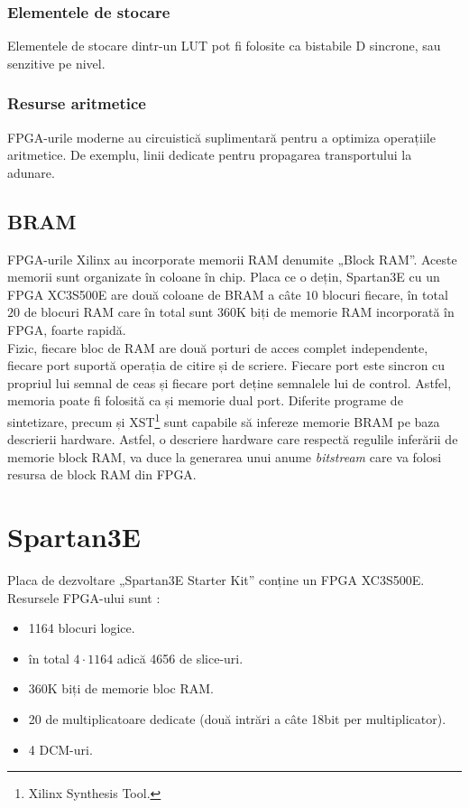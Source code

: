 \documentclass[12pt,twoside,a4paper,fleqn]{book}
\begin{document}
\subsubsection{Elementele de stocare}
Elementele de stocare dintr-un LUT pot fi folosite ca bistabile D sincrone, sau senzitive pe nivel.
\subsubsection{Resurse aritmetice}
FPGA-urile moderne au circuistică suplimentară pentru a optimiza operațiile aritmetice. De exemplu, linii dedicate pentru propagarea transportului la adunare.

\subsection{BRAM}
FPGA-urile Xilinx au incorporate memorii RAM denumite „Block RAM”. Aceste memorii sunt organizate în coloane în chip. Placa ce o dețin, Spartan3E cu un FPGA XC3S500E are două coloane de BRAM a câte $10$ blocuri fiecare, în total $20$ de blocuri RAM care în total sunt 360K biți de memorie RAM incorporată în FPGA, foarte rapidă.\cite{xilinx_ug331}\\
Fizic, fiecare bloc de RAM are două porturi de acces complet independente, fiecare port suportă operația de citire și de scriere. Fiecare port este sincron cu propriul lui semnal de ceas și fiecare port deține semnalele lui de control. Astfel, memoria poate fi folosită ca și memorie dual port. Diferite programe de sintetizare, precum și XST\footnote{Xilinx Synthesis Tool.} sunt capabile să infereze memorie BRAM pe baza descrierii hardware. Astfel, o descriere hardware care respectă regulile inferării de memorie block RAM, va duce la generarea unui anume \emph{bitstream} care va folosi resursa de block RAM din FPGA. \cite{xilinx_ug331}


\section{Spartan3E}
Placa de dezvoltare „Spartan3E Starter Kit” conține un FPGA XC3S500E.\\
Resursele FPGA-ului sunt \cite{xilinx_spartan_datasheet}:
\begin{itemize}
\item 1164 blocuri logice.
\item în total $4 \cdot 1164$ adică 4656 de slice-uri.
\item 360K biți de memorie bloc RAM.
\item 20 de multiplicatoare dedicate (două intrări a câte 18bit per multiplicator).
\item 4 DCM-uri.
\end{itemize}
\end{document}
